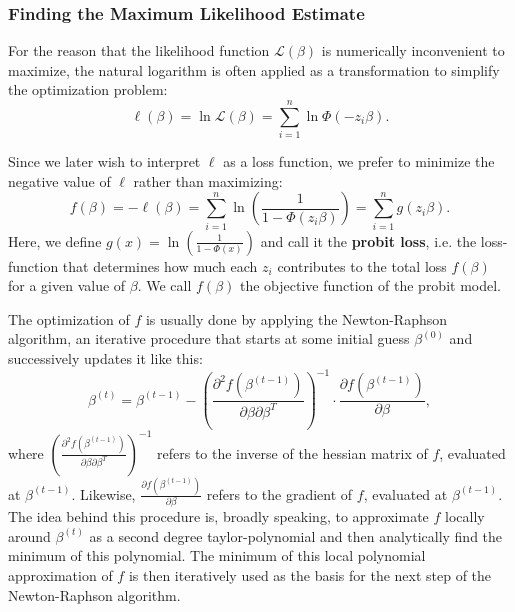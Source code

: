 \subsubsection{Finding the Maximum Likelihood Estimate}

For the reason that the likelihood function $\mathcal{L}(\beta)$ is
numerically inconvenient to maximize, the natural logarithm is often
applied as a transformation to simplify the optimization problem:
\begin{equation}
    \ell(\beta) = \ln \mathcal{L}(\beta) = \sum_{i=1}^n \ln \Phi(- z_i \beta).
\end{equation}

\noindent Since we later wish to interpret $\ell$ as a loss function, we prefer
to minimize the negative value of $\ell$ rather than maximizing:
\begin{equation}
    f(\beta) = -\ell(\beta)
    = \sum_{i=1}^n \ln \left( \frac{1}{1 - \Phi(z_i \beta)} \right)
    = \sum_{i=1}^n g(z_i \beta).
\end{equation}
Here, we define $g(x) = \ln \left(\frac{1}{1 - \Phi(x)}\right)$
and call it the \textbf{probit loss}, i.e. the loss-function that
determines how much each $z_i$ contributes to the total loss $f(\beta)$
for a given value of $\beta$.
We call $f(\beta)$ the objective function of the probit model.

The optimization of $f$ is usually done by applying the
Newton-Raphson algorithm, an iterative procedure that
starts at some initial guess $\beta^{(0)}$ and successively
updates it like this:
\begin{equation}
    \beta^{(t)} = \beta^{(t-1)} - \left(\frac{\partial^2f(\beta^{(t-1)})}{\partial\beta\partial\beta^T}\right)^{-1}
    \cdot \frac{\partial f(\beta^{(t-1)})}{\partial\beta},
\end{equation}
where $\left(\frac{\partial^2f(\beta^{(t-1)})}{\partial\beta\partial\beta^T}\right)^{-1}$
refers to the inverse of the hessian matrix of $f$, evaluated at
$\beta^{(t-1)}$. Likewise, $\frac{\partial f(\beta^{(t-1)})}{\partial\beta}$
refers to the gradient of $f$, evaluated at $\beta^{(t-1)}$.
The idea behind this procedure is, broadly speaking, to approximate
$f$ locally around $\beta^{(t)}$ as a second degree taylor-polynomial and then
analytically find the minimum of this polynomial. The minimum of this
local polynomial approximation of $f$ is then
iteratively used as the basis for the next step of the
Newton-Raphson algorithm.

